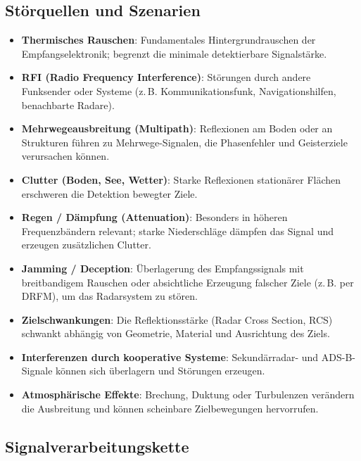\subsection{Störquellen und Szenarien}
\begin{itemize}
  \item \textbf{Thermisches Rauschen}: Fundamentales Hintergrundrauschen der Empfangselektronik; begrenzt die minimale detektierbare Signalstärke.
  \item \textbf{RFI (Radio Frequency Interference)}: Störungen durch andere Funksender oder Systeme (z.\,B. Kommunikationsfunk, Navigationshilfen, benachbarte Radare).
  \item \textbf{Mehrwegeausbreitung (Multipath)}: Reflexionen am Boden oder an Strukturen führen zu Mehrwege-Signalen, die Phasenfehler und Geisterziele verursachen können.
  \item \textbf{Clutter (Boden, See, Wetter)}: Starke Reflexionen stationärer Flächen erschweren die Detektion bewegter Ziele.
  \item \textbf{Regen / Dämpfung (Attenuation)}: Besonders in höheren Frequenzbändern relevant; starke Niederschläge dämpfen das Signal und erzeugen zusätzlichen Clutter.
  \item \textbf{Jamming / Deception}: Überlagerung des Empfangssignals mit breitbandigem Rauschen oder absichtliche Erzeugung falscher Ziele (z.\,B. per DRFM), um das Radarsystem zu stören.
  \item \textbf{Zielschwankungen}: Die Reflektionsstärke (Radar Cross Section, RCS) schwankt abhängig von Geometrie, Material und Ausrichtung des Ziels.
  \item \textbf{Interferenzen durch kooperative Systeme}: Sekundärradar- und ADS-B-Signale können sich überlagern und Störungen erzeugen.
  \item \textbf{Atmosphärische Effekte}: Brechung, Duktung oder Turbulenzen verändern die Ausbreitung und können scheinbare Zielbewegungen hervorrufen.
\end{itemize}

\subsection{Signalverarbeitungskette}
\usetikzlibrary{arrows.meta, positioning}

